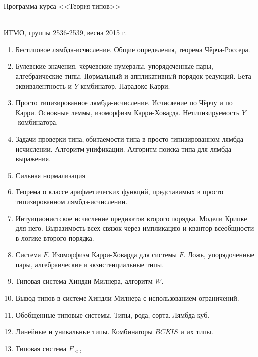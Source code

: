 \documentclass[12pt,a4paper,oneside]{book}
\begin{document}
\begin{center}
\begin{Large}Программа курса <<Теория типов>>\end{Large}\\
ИТМО, группы 2536-2539, весна 2015 г.
\end{center}

\begin{enumerate}
\item Бестиповое лямбда-исчисление. Общие определения, теорема Чёрча-Россера.
\item Булевские значения, чёрчевские нумералы, упорядоченные пары, 
алгебраические типы. Нормальный и аппликативный порядок редукций.
Бета-эквивалентность и $Y$-комбинатор. Парадокс Карри.
\item Просто типизированное лямбда-исчисление. Исчисление по Чёрчу и по Карри.
Основные леммы, изоморфизм Карри-Ховарда. Нетипизируемость $Y$-комбинатора.
\item Задачи проверки типа, обитаемости типа в просто типизированном лямбда-исчислении.
Алгоритм унификации. Алгоритм поиска типа для лямбда-выражения.
\item Сильная нормализация.
\item Теорема о классе арифметических функций, представимых в просто типизированном лямбда-исчислении.
\item Интуиционистское исчисление предикатов второго порядка. Модели Крипке для него.
Выразимость всех связок через импликацию и квантор всеобщности в логике второго порядка.
\item Система $F$. Изоморфизм Карри-Ховарда для системы $F$.
Ложь, упорядоченные пары, алгебраические и экзистенциальные типы.
\item Типовая система Хиндли-Милнера, алгоритм $W$.
\item Вывод типов в системе Хиндли-Милнера с использованием ограничений.
\item Обобщенные типовые системы. Типы, рода, сорта. Лямбда-куб.
\item Линейные и уникальные типы. Комбинаторы $BCKIS$ и их типы.
\item Типовая система $F_{<:}$
\end{enumerate}
\end{document}
